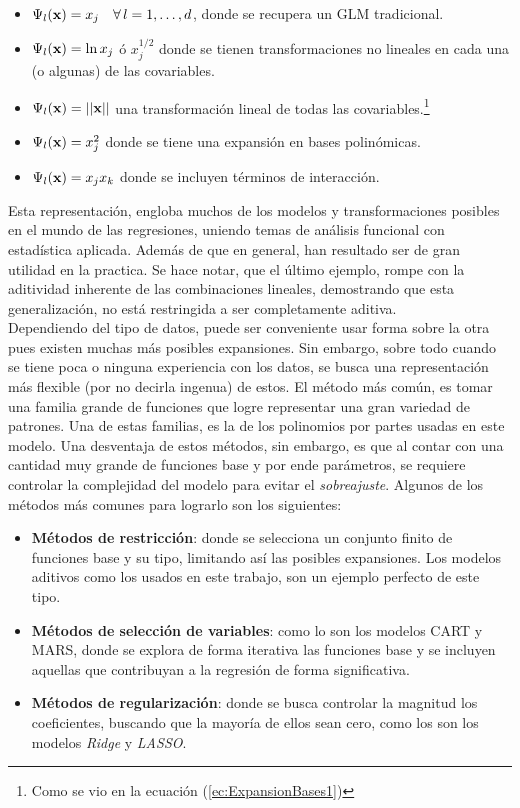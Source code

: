 \documentclass[../Main/Main.tex]{subfiles}
\begin{document}
\begin{itemize}
	\item $\Psi_l(\mathbf{x}) = x_j \quad \forall\,l = 1,\ldots,d$, donde se recupera un GLM tradicional.
	\item $\Psi_l(\mathbf{x}) = \ln x_j$ ó $x_j^{1/2}$ donde se tienen transformaciones no lineales en cada una (o algunas) de las covariables.
	\item $\Psi_l(\mathbf{x}) = ||\mathbf{x}||$ una transformación lineal de todas las covariables.\footnote{Como se vio en la ecuación (\ref{ec:ExpansionBases1})} 
	\item $\Psi_l(\mathbf{x}) = x_j^2$ donde se tiene una expansión en bases polinómicas.
	\item $\Psi_l(\mathbf{x}) = x_jx_k$ donde se incluyen términos de interacción. 
\end{itemize}

Esta representación, engloba muchos de los modelos y transformaciones posibles en el mundo de las regresiones, uniendo temas de análisis funcional con estadística aplicada. Además de que en general, han resultado ser de gran utilidad en la practica. Se hace notar, que el último ejemplo, rompe con la aditividad inherente de las combinaciones lineales, demostrando que esta generalización, no está restringida a ser completamente aditiva.\\

Dependiendo del tipo de datos, puede ser conveniente usar forma sobre la otra pues existen muchas más posibles expansiones. Sin embargo, sobre todo cuando se tiene poca o ninguna experiencia con los datos, se busca una representación más flexible (por no decirla ingenua) de estos. El método más común, es tomar una familia grande de funciones que logre representar una gran variedad de patrones. Una de estas familias, es la de los polinomios por partes usadas en este modelo. Una desventaja de estos métodos, sin embargo, es que al contar con una cantidad muy grande de funciones base y por ende parámetros, se requiere controlar la complejidad del modelo para evitar el \textit{sobreajuste}. Algunos de los métodos más comunes para lograrlo son los siguientes:

\begin{itemize}
	\item \textbf{Métodos de restricción}: donde se selecciona un conjunto finito de funciones base y su tipo, limitando así las posibles expansiones. Los modelos aditivos como los usados en este trabajo, son un ejemplo perfecto de este tipo.  
	\item \textbf{Métodos de selección de variables}: como lo son los modelos CART y MARS, donde se explora de forma iterativa las funciones base y se incluyen aquellas que contribuyan a la regresión de forma significativa.
	\item \textbf{Métodos de regularización}: donde se busca controlar la magnitud los coeficientes, buscando que la mayoría de ellos sean cero, como los son los modelos \textit{Ridge} y  \textit{LASSO}.
\end{itemize}
\end{document}
